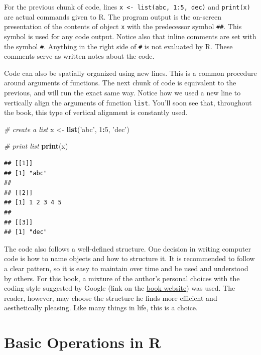 \documentclass[11pt,]{book}
\newenvironment{Shaded}{\begin{snugshade}}{\end{snugshade}}
\newcommand{\KeywordTok}[1]{\textcolor[rgb]{0.27,0.27,0.27}{\textbf{#1}}}
\newcommand{\DecValTok}[1]{\textcolor[rgb]{0.06,0.06,0.06}{#1}}
\newcommand{\StringTok}[1]{\textcolor[rgb]{0.5,0.5,0.5}{#1}}
\newcommand{\CommentTok}[1]{\textcolor[rgb]{0.56,0.35,0.01}{\textit{#1}}}
\newcommand{\OperatorTok}[1]{\textcolor[rgb]{0.81,0.36,0.00}{\textbf{#1}}}
\newcommand{\NormalTok}[1]{#1}
\begin{document}
For the previous chunk of code, lines
\texttt{x\ \textless{}-\ list(\textquotesingle{}abc\textquotesingle{},\ 1:5,\ \textquotesingle{}dec\textquotesingle{})}
and \texttt{print(x)} are actual commands given to R. The program output
is the on-screen presentation of the contents of object \texttt{x} with
the predecessor symbol \texttt{\#\#}. This symbol is used for any code
output. Notice also that inline comments are set with the symbol
\texttt{\#}. Anything in the right side of \texttt{\#} is not evaluated
by R. These comments serve as written notes about the code.

Code can also be spatially organized using new lines. This is a common
procedure around arguments of functions. The next chunk of code is
equivalent to the previous, and will run the exact same way. Notice how
we used a new line to vertically align the arguments of function
\texttt{list}. You'll soon see that, throughout the book, this type of
vertical alignment is constantly used.

\begin{Shaded}
\begin{Highlighting}[]
\CommentTok{# create a list}
\NormalTok{x <-}\StringTok{ }\KeywordTok{list}\NormalTok{(}\StringTok{'abc'}\NormalTok{, }
          \DecValTok{1}\OperatorTok{:}\DecValTok{5}\NormalTok{, }
          \StringTok{'dec'}\NormalTok{)}

\CommentTok{# print list}
\KeywordTok{print}\NormalTok{(x)}
\end{Highlighting}
\end{Shaded}

\begin{verbatim}
## [[1]]
## [1] "abc"
## 
## [[2]]
## [1] 1 2 3 4 5
## 
## [[3]]
## [1] "dec"
\end{verbatim}

The code also follows a well-defined structure. One decision in writing
computer code is how to name objects and how to structure it. It is
recommended to follow a clear pattern, so it is easy to maintain over
time and be used and understood by others. For this book, a mixture of
the author's personal choices with the coding style suggested by Google
(link on the \href{https://sites.google.com/view/pafdr/home}{book
website}) was used. The reader, however, may choose the structure he
finds more efficient and aesthetically pleasing. Like many things in
life, this is a choice.

\hypertarget{basicoperations}{\chapter{Basic Operations in
R}\label{basicoperations}}
\end{document}
